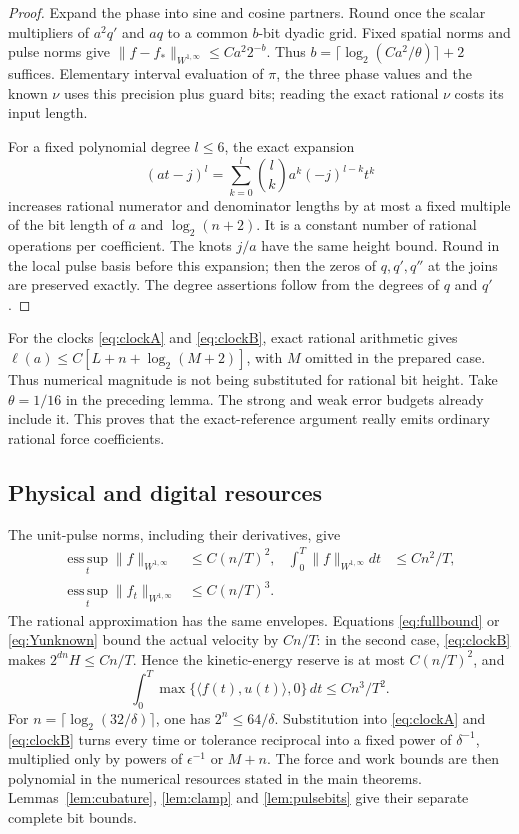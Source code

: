\documentclass[11pt,a4paper]{amsart}
\theoremstyle{definition}
\theoremstyle{remark}
\numberwithin{equation}{section}
\newcommand{\ip}[2]{\langle #1,#2\rangle}
\newcommand{\norm}[1]{\lVert #1\rVert}
\newcommand{\esssup}{\operatorname*{ess\,sup}}
\begin{document}
\begin{proof}
Expand the phase into sine and cosine partners. Round once the scalar multipliers of $a^2q'$ and $aq$ to a common $b$-bit dyadic grid. Fixed spatial norms and pulse norms give
$\norm{f-f_*}_{W^{1,\infty}}\le C a^2 2^{-b}$.
Thus $b=\lceil\log_2(Ca^2/\theta)\rceil+2$ suffices. Elementary interval evaluation of $\pi$, the three phase values and the known $\nu$ uses this precision plus guard bits; reading the exact rational $\nu$ costs its input length.

For a fixed polynomial degree $l\le6$, the exact expansion
\[
 (at-j)^l=\sum_{k=0}^l\binom lk a^k(-j)^{l-k}t^k
\]
increases rational numerator and denominator lengths by at most a fixed multiple of the bit length of $a$ and $\log_2(n+2)$. It is a constant number of rational operations per coefficient. The knots $j/a$ have the same height bound. Round in the local pulse basis before this expansion; then the zeros of $q,q',q''$ at the joins are preserved exactly. The degree assertions follow from the degrees of $q$ and $q'$.
\end{proof}

For the clocks \eqref{eq:clockA} and \eqref{eq:clockB}, exact rational arithmetic gives $\ell(a)\le C[L+n+\log_2(M+2)]$, with $M$ omitted in the prepared case. Thus numerical magnitude is not being substituted for rational bit height. Take $\theta=1/16$ in the preceding lemma. The strong and weak error budgets already include it. This proves that the exact-reference argument really emits ordinary rational force coefficients.

\subsection{Physical and digital resources}
The unit-pulse norms, including their derivatives, give
\begin{align}
 \esssup_t\norm f_{W^{1,\infty}}&\le C(n/T)^2,
 &\int_0^T\norm f_{W^{1,\infty}}dt&\le Cn^2/T,\label{eq:forcesize}\\
 \esssup_t\norm{f_t}_{W^{1,\infty}}&\le C(n/T)^3.
\end{align}
The rational approximation has the same envelopes. Equations \eqref{eq:fullbound} or \eqref{eq:Yunknown} bound the actual velocity by $Cn/T$: in the second case, \eqref{eq:clockB} makes $2^{dn}H\le Cn/T$. Hence the kinetic-energy reserve is at most $C(n/T)^2$, and
\begin{equation}\label{eq:work}
 \int_0^T\max\{\ip{f(t)}{u(t)},0\}\,dt\le Cn^3/T^2.
\end{equation}
For $n=\lceil\log_2(32/\delta)\rceil$, one has $2^n\le64/\delta$. Substitution into \eqref{eq:clockA} and \eqref{eq:clockB} turns every time or tolerance reciprocal into a fixed power of $\delta^{-1}$, multiplied only by powers of $\epsilon^{-1}$ or $M+n$. The force and work bounds are then polynomial in the numerical resources stated in the main theorems. Lemmas~\ref{lem:cubature}, \ref{lem:clamp} and \ref{lem:pulsebits} give their separate complete bit bounds.
\end{document}
